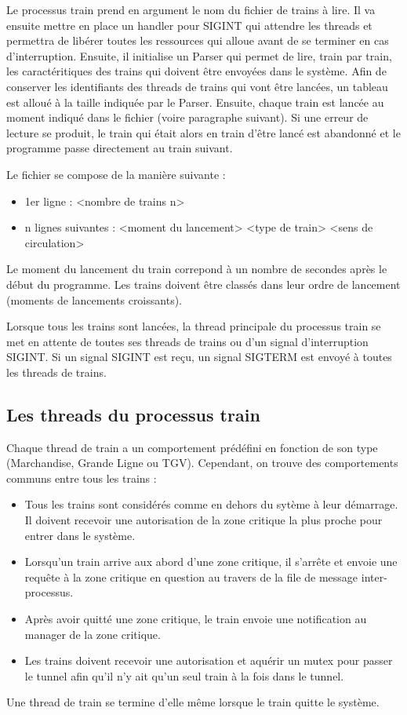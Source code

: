\documentclass[a4paper,12pt]{article}
\begin{document}
Le processus train prend en argument le nom du fichier de trains à lire. Il va ensuite mettre en place un handler pour SIGINT qui attendre les threads et permettra de libérer toutes les ressources qui alloue avant de se terminer en cas d'interruption. Ensuite, il initialise un Parser qui permet de lire, train par train, les caractéritiques des trains qui doivent être envoyées dans le système. Afin de conserver les identifiants des threads de trains qui vont être lancées, un tableau est alloué à la taille indiquée par le Parser. Ensuite, chaque train est lancée au moment indiqué dans le fichier (voire paragraphe suivant). Si une erreur de lecture se produit, le train qui était alors en train d'être lancé est abandonné et le programme passe directement au train suivant.

Le fichier se compose de la manière suivante :

\begin{itemize}
	\item 1er ligne : <nombre de trains n>
	\item n lignes suivantes : <moment du lancement> <type de train> <sens de circulation>
\end{itemize}

Le moment du lancement du train correpond à un nombre de secondes après le début du programme. Les trains doivent être classés dans leur ordre de lancement (moments de lancements croissants).

Lorsque tous les trains sont lancées, la thread principale du processus train se met en attente de toutes ses threads de trains ou d'un signal d'interruption SIGINT. Si un signal SIGINT est reçu, un signal SIGTERM est envoyé à toutes les threads de trains.

\subsection{Les threads du processus train}

Chaque thread de train a un comportement prédéfini en fonction de son type (Marchandise, Grande Ligne ou TGV). Cependant, on trouve des comportements communs entre tous les trains :
\begin{itemize}
	\item Tous les trains sont considérés comme en dehors du sytème à leur démarrage. Il doivent recevoir une autorisation de la zone critique la plus proche pour entrer dans le système.
	\item Lorsqu'un train arrive aux abord d'une zone critique, il s'arrête et envoie une requête à la zone critique en question au travers de la file de message inter-processus.
	\item Après avoir quitté une zone critique, le train envoie une notification au manager de la zone critique.
	\item Les trains doivent recevoir une autorisation et aquérir un mutex pour passer le tunnel afin qu'il n'y ait qu'un seul train à la fois dans le tunnel.
\end{itemize}
Une thread de train se termine d'elle même lorsque le train quitte le système.
\end{document}
